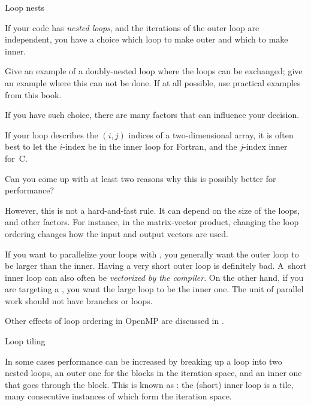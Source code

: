 
 {Loop nests}

If your code has \emph{nested loops}, and the iterations of the outer
loop are independent, you have a choice which loop to make outer and
which to make inner.

\begin{exercise}
  Give an example of a doubly-nested loop where the loops can be
  exchanged; give an example where this can not be done. If at all
  possible, use practical examples from this book.
\end{exercise}

If you have such choice, there are many factors that can influence
your decision.

%
If your loop describes the $(i,j)$ indices of a two-dimensional array,
it is often best to let the $i$-index be in the inner loop for
Fortran, and the $j$-index inner for~C.

\begin{exercise}
  Can you come up with at least two reasons why this is possibly better for performance?
\end{exercise}

However, this is not a hard-and-fast rule. It can depend on the size
of the loops, and other factors. For instance, in the matrix-vector
product, changing the loop ordering changes how the input and output
vectors are used.


%
If you want to parallelize your loops with , you
generally want the outer loop to be larger than the inner. Having a
very short outer loop is definitely bad. A~short inner loop can also
often be \emph{vectorized by the
  compiler}.
On the other hand, if you are targeting a , you want the
large loop to be the inner one. The unit of parallel work should not have branches
or loops.

Other effects of loop ordering in OpenMP are discussed in .


 {Loop tiling}
\label{sec:loop-tiling}

In some cases performance can be increased by breaking up a loop into
two nested loops, an outer one for the blocks in the iteration space,
and an inner one that goes through the block. This is known as
: the (short) inner loop is a tile, many
consecutive instances of which form the iteration space.

